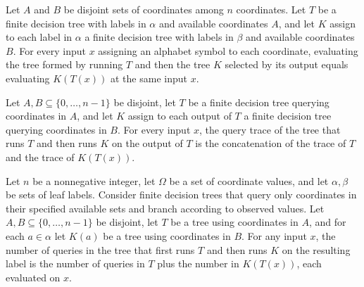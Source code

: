 \begin{theorem}
\label{FABL.FiniteDecisionTree.eval_thenOnDisjoint}
\leanok
{}
Let $A$ and $B$ be disjoint sets of coordinates among $n$ coordinates. Let $T$ be a
finite decision tree with labels in $\alpha$ and available coordinates $A$, and let $K$
assign to each label in $\alpha$ a finite decision tree with labels in $\beta$ and
available coordinates $B$. For every input $x$ assigning an alphabet symbol to each
coordinate, evaluating the tree formed by running $T$ and then the tree $K$ selected by
its output equals evaluating $K(T(x))$ at the same input $x$.
\end{theorem}

\begin{theorem}
\label{FABL.FiniteDecisionTree.queryTrace_thenOnDisjoint}
\leanok
{}
Let $A,B\subseteq\{0,\ldots,n-1\}$ be disjoint, let $T$ be a finite decision tree
querying coordinates in $A$, and let $K$ assign to each output of $T$ a finite decision
tree querying coordinates in $B$. For every input $x$, the query trace of the tree that
runs $T$ and then runs $K$ on the output of $T$ is the concatenation of the trace of $T$
and the trace of $K(T(x))$.
\end{theorem}

\begin{theorem}
\label{FABL.FiniteDecisionTree.queryCount_thenOnDisjoint}
\leanok
{}
Let $n$ be a nonnegative integer, let $\Omega$ be a set of coordinate values, and let
$\alpha,\beta$ be sets of leaf labels. Consider finite decision trees that query only
coordinates in their specified available sets and branch according to observed values.
Let $A,B\subseteq\{0,\ldots,n-1\}$ be disjoint, let $T$ be a tree using coordinates in
$A$, and for each $a\in\alpha$ let $K(a)$ be a tree using coordinates in $B$. For any
input $x$, the number of queries in the tree that first runs $T$ and then runs $K$ on
the resulting label is the number of queries in $T$ plus the number in $K(T(x))$, each
evaluated on $x$.
\end{theorem}

